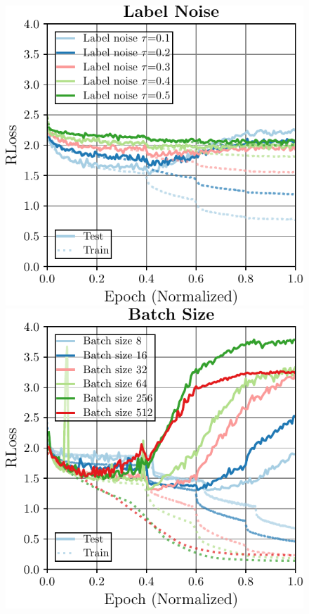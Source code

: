 \begin{figure}[t]
\begin{minipage}[t]{0.23\textwidth}
	\end{minipage}
	\begin{minipage}[t]{0.23\textwidth}
		\includegraphics[width=\textwidth]{plots_main_understanding_ablation_ln}
	\end{minipage}
	\begin{minipage}[t]{0.23\textwidth}
		\includegraphics[width=\textwidth]{plots_supp_understanding_ablation_bs}

\end{minipage}
\end{figure}
